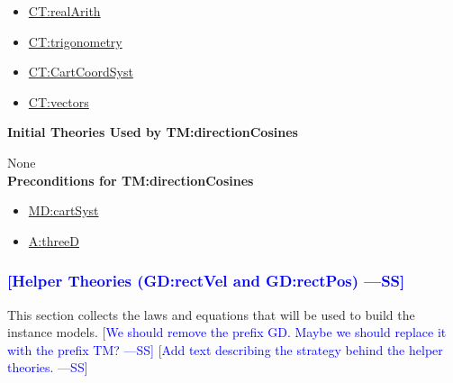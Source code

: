 \documentclass[12pt]{article}
\newcommand{\authornote}[3]{\textcolor{#1}{[#3 ---#2]}}
\newcommand{\authornote}[3]{}
\newcommand{\wss}[1]{\authornote{blue}{SS}{#1}}
\begin{document}
\begin{itemize}
\item \hyperref[CT:realArith]{CT:realArith}
\item \hyperref[CT:trigonometry]{CT:trigonometry}
\item \hyperref[CT:CartCoordSyst]{CT:CartCoordSyst}
\item \hyperref[CT:vectors]{CT:vectors}
\end{itemize}

\noindent \textbf{Initial Theories Used by TM:directionCosines}

None
~\\

\noindent \textbf{Preconditions for TM:directionCosines}

\begin{itemize}
\item \hyperref[MD:cartSyst]{MD:cartSyst}
\item \hyperref[threeD]{A:threeD}
\end{itemize}

\subsubsection{\wss{Helper Theories (GD:rectVel and GD:rectPos)}}
\label{Sec:GDs}
This section collects the laws and equations that will be used to build the instance models.
\wss{We should remove the prefix GD.  Maybe we should replace it with the prefix
TM?} \wss{Add text describing the strategy behind the helper theories.}
\end{document}
